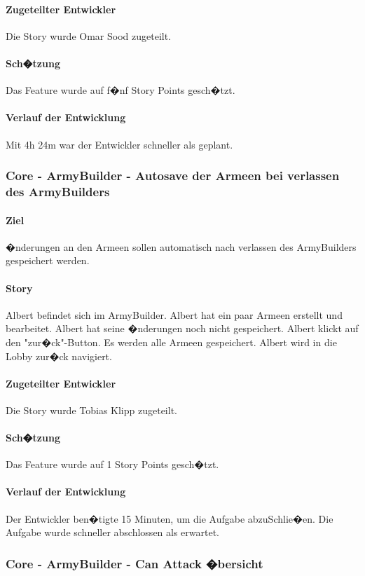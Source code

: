 \documentclass[12pt, titlepage]{scrartcl}
\begin{document}
			\paragraph{Zugeteilter Entwickler} Die Story wurde Omar Sood zugeteilt.
			\paragraph{Sch�tzung}
			Das Feature wurde auf f�nf Story Points gesch�tzt.
			\paragraph{Verlauf der Entwicklung} 
			Mit 4h 24m war der Entwickler schneller als geplant.  
			\subsubsection{Core - ArmyBuilder - Autosave der Armeen bei verlassen des ArmyBuilders}
			\paragraph{Ziel} �nderungen an den Armeen sollen automatisch nach verlassen des ArmyBuilders gespeichert werden.
			\paragraph{Story} Albert befindet sich im ArmyBuilder. Albert hat ein paar Armeen erstellt und bearbeitet. Albert hat seine �nderungen noch nicht gespeichert. Albert klickt auf den "zur�ck"-Button. Es werden alle Armeen gespeichert. Albert wird in die Lobby zur�ck navigiert.
			\paragraph{Zugeteilter Entwickler} Die Story wurde Tobias Klipp zugeteilt.
			\paragraph{Sch�tzung}
			Das Feature wurde auf 1 Story Points gesch�tzt.
			\paragraph{Verlauf der Entwicklung} 
			Der Entwickler ben�tigte 15 Minuten, um die Aufgabe abzuSchlie�en. Die Aufgabe wurde schneller abschlossen als erwartet.
			\subsubsection{Core - ArmyBuilder - Can Attack �bersicht}
\end{document}
